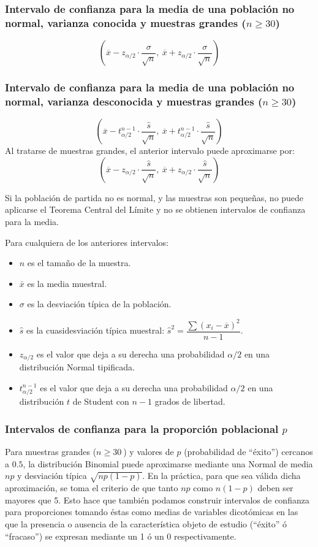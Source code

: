 \subsubsection{Intervalo de confianza para la media de una población no normal, varianza conocida y muestras grandes
($n\geq 30$)}
\[
\left( \overline{x}-z_{\alpha /2}\cdot \dfrac{\sigma }{\sqrt{n}},\ \overline{x}+z_{\alpha /2}\cdot \dfrac{\sigma
}{\sqrt{n}}\right)
\]


\subsubsection{Intervalo de confianza para la media de una población no normal, varianza desconocida y muestras grandes
($n\geq30$)} 
\[ 
\left( \overline{x}-t_{\alpha /2}^{n-1}\cdot \dfrac{\hat s}{\sqrt{n}},\ \overline{x}+t_{\alpha /2}^{n-1}\cdot
\dfrac{\hat s}{\sqrt{n}}\right) 
\]
Al tratarse de muestras grandes, el anterior intervalo puede aproximarse por:
\[
\left( \overline{x}-z_{\alpha /2}\cdot \dfrac{\hat s}{\sqrt{n}},\ \overline{x}+z_{\alpha /2}\cdot
\dfrac{\hat s}{\sqrt{n}}\right)
\]

Si la población de partida no es normal, y las muestras son pequeñas, no puede aplicarse el Teorema Central del Límite y
no se obtienen intervalos de confianza para la media.

Para cualquiera de los anteriores intervalos:
\begin{itemize}[label=--]
\item $n$ es el tamaño de la muestra.
\item $\bar x$ es la media muestral.
\item $\sigma $ es la desviación típica de la población.
\item $\hat s$ es la cuasidesviación típica muestral: $\hat s^{2}= \dfrac{\sum \left( x_{i}-\overline{x}\right)
^{2}}{n-1}$. 
\item $z_{\alpha /2}$ es el valor que deja a su derecha una probabilidad $\alpha /2 $ en una distribución Normal
tipificada.
\item $t_{\alpha /2}^{n-1}$ es el valor que deja a su derecha una probabilidad $\alpha/2$ en una distribución $t$ de
Student con $n-1$ grados de libertad.
\end{itemize}


\subsubsection {Intervalos de confianza para la proporción poblacional $p$}
Para muestras grandes ($n\geq30~$) y valores de $p$ (probabilidad de ``éxito'') cercanos a $0.5$, la distribución
Binomial puede aproximarse mediante una Normal de media $np$ y desviación típica $\sqrt {np(1-p)}$. En la práctica, para
que sea válida dicha aproximación, se toma el criterio de que tanto $np$ como $n(1-p)$ deben ser mayores que 5. Esto hace
que también podamos construir intervalos de confianza para proporciones tomando éstas como medias de variables
dicotómicas en las que la presencia o ausencia de la característica objeto de estudio (``éxito'' ó ``fracaso'') se
expresan mediante un 1 ó un 0 respectivamente.

